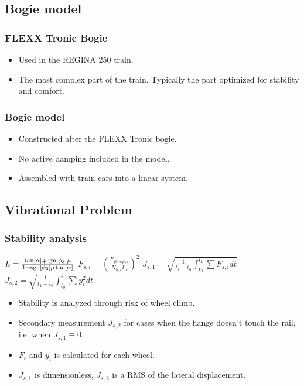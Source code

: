 \documentclass{beamer}
\begin{document}
\subsection{Bogie model}

\begin{frame}
 \frametitle{FLEXX Tronic Bogie}
 \begin{figure}
  \centering
 \end{figure}
 \begin{itemize}
  \item Used in the REGINA 250 train.
  \item The most complex part of the train. Typically the part optimized for stability and comfort.
 \end{itemize}
\end{frame}

\begin{frame}
 \frametitle{Bogie model}
 \begin{figure}
  \centering
 \end{figure}
 \begin{itemize}
  \item Constructed after the FLEXX Tronic bogie.
  \item No active damping included in the model.
  \item Assembled with train cars into a linear system.
 \end{itemize}
\end{frame}

\subsection{Vibrational Problem}
\begin{frame}
 \frametitle{Stability analysis}
 \begin{center}
  $L = \frac{\tan[\alpha]\mp\operatorname{sgn}[\phi_3] \mu}{1\pm\operatorname{sgn}[\phi_3] \mu \tan[\alpha]}$\hspace{10mm}
  $F_{s,i} = \left(\frac{F_{flange,i}}{N_{h,i} L_i}\right)^2$\hspace{10mm}
  $J_{s,1} = \sqrt{\frac{1}{t_1-t_0}\int_{t_0}^{t_1} \sum F_{s,i} dt}$\\
  $J_{s,2} = \sqrt{\frac{1}{t_1-t_0}\int_{t_0}^{t_1} \sum y_i^2 dt}$
 \end{center}
 \begin{itemize}
  \item Stability is analyzed through risk of wheel climb.
  \item Secondary measurement $J_{s,2}$ for cases when the flange doesn't touch the rail, i.e. when $J_{s,1}\equiv0$.
  \item $F_i$ and $y_i$ is calculated for each wheel.
  \item $J_{s,1}$ is dimensionless, $J_{s,2}$ is a RMS of the lateral displacement.
 \end{itemize}
\end{frame}
\end{document}
